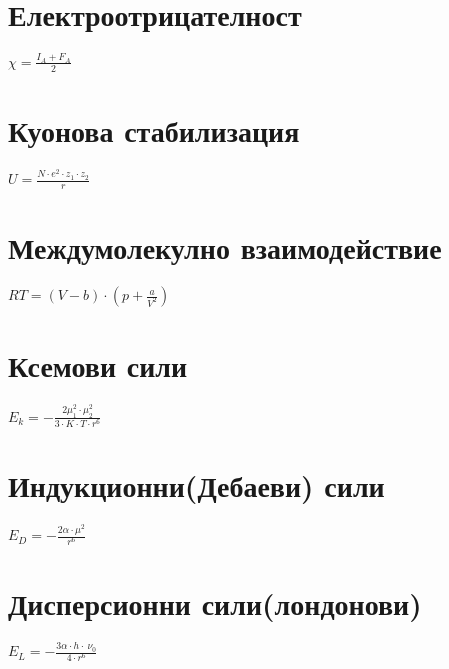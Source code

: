 \documentclass[11pt]{Article}
\begin{document}
\section{Електроотрицателност}
\begin{center}
{\Huge $\chi = \frac{I_A+F_A}{2}$ }\\
\end{center}
\newpage

\section{Куонова стабилизация}

\begin{center}
{\Huge$U=\frac{N \cdot e^2 \cdot z_1 \cdot z_2}{r} $}\\
\end{center}
\newpage

\section{Междумолекулно взаимодействие}
\begin{center}
{\Huge$ RT = (V-b)\cdot(p + \frac{a}{V^2}) $}\\
\end{center}
\newpage

\section{Ксемови сили}

\begin{center}
{\Huge$E_k = -\frac{2\mu^2_1 \cdot \mu^2_2}{3\cdot K \cdot T \cdot r^6} $}\\
\end{center}
\newpage

\section{Индукционни(Дебаеви) сили}

\begin{center}
{\Huge$E_D = - \frac{2\alpha \cdot \mu^2}{r^6} $}\\
\end{center}
\newpage

\section{Дисперсионни сили(лондонови)}
\begin{center}
{\Huge $E_L =-\frac{3\alpha \cdot h \cdot\ \nu_0}{4\cdot r^6} $ }\\
\end{center}
\newpage
\end{document}
